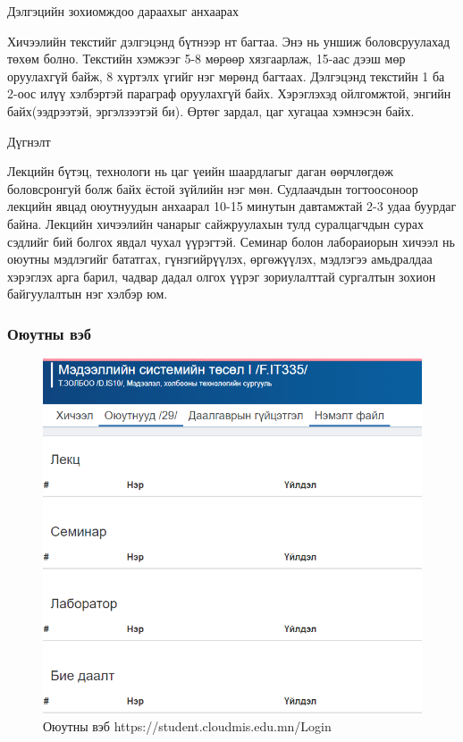 	Дэлгэцийн зохиомждоо дараахыг анхаарах
	
		Хичээлийн текстийг дэлгэцэнд бүтнээр нт багтаа. Энэ нь уншиж боловсруулахад төхөм болно.
		Текстийн хэмжээг 5-8 мөрөөр хязгаарлаж, 15-аас дээш мөр оруулахгүй байж, 8 хүртэлх үгийг нэг мөрөнд багтаах.
		Дэлгэцэнд текстийн 1 ба 2-оос илүү хэлбэртэй параграф оруулахгүй байх.
		Хэрэглэхэд ойлгомжтой, энгийн байх(ээдрээтэй, эргэлзээтэй би).
		Өртөг зардал, цаг хугацаа хэмнэсэн байх.
		
	Дүгнэлт 
	
		Лекцийн бүтэц, технологи нь цаг үеийн шаардлагыг даган өөрчлөгдөж боловсронгуй болж байх ёстой зүйлийн нэг мөн.
		Судлаачдын тогтоосоноор лекцийн явцад оюутнуудын анхаарал 10-15 минутын давтамжтай 2-3 удаа буурдаг байна.
		Лекцийн хичээлийн чанарыг сайжруулахын тулд суралцагчдын сурах сэдлийг бий болгох явдал чухал үүрэгтэй.
		Семинар болон лабораиорын хичээл нь оюутны мэдлэгийг бататгах, гүнзгийрүүлэх, өргөжүүлэх, мэдлэгээ амьдралдаа хэрэглэх арга барил, чадвар дадал олгох үүрэг зориулалттай сургалтын зохион байгуулалтын нэг хэлбэр юм.
		\newpage
		\subsubsection{Оюутны вэб}
		\begin{figure}
			\centering
			\includegraphics[scale=0.5]{Diagrams/Sudalgaa1}
			\caption[Оюутны вэб https://student.cloudmis.edu.mn/Login]{Оюутны вэб https://student.cloudmis.edu.mn/Login}
			\label{text}
		\end{figure}
	
